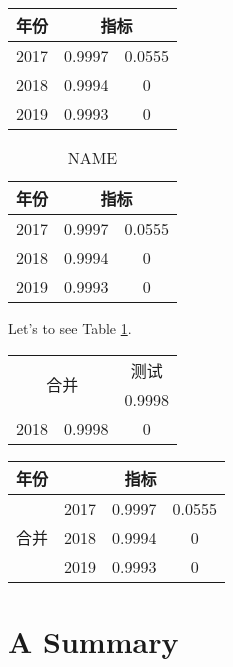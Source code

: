 \documentclass{mcmthesis}
\begin{document}
\begin{center}
\begin{tabular}{c|cc}
\hline
年份 & \multicolumn{2}{c}{指标} \\
\hline
2017 & 0.9997 & 0.0555 \\
2018 & 0.9994 & 0      \\
2019 & 0.9993 & 0      \\
\hline
\end{tabular}
\end{center}

\lipsum[3]
\begin{table}[h]
\centering
\begin{tabular}{c|cc}
\hline
年份 & \multicolumn{2}{c}{指标} \\
\hline
2017 & 0.9997 & 0.0555 \\
2018 & 0.9994 & 0      \\
2019 & 0.9993 & 0      \\
\hline

\end{tabular}
\caption{NAME}\label{SIGN}
\end{table}

Let's to see Table \ref{SIGN}.

\begin{minipage}{0.5\linewidth}
\begin{tabular}{|c|c|c|}
\hline
\multicolumn{2}{|c|}{\multirow{2}{*}{合并}} & 测试 \\
\cline{3-3}
\multicolumn{2}{|c|}{} & 0.9998 \\
\hline
2018 & 0.9998 & 0 \\
\hline
\end{tabular}
\end{minipage}
\begin{minipage}{0.5\linewidth}
\begin{tabular}{c|ccc}
\hline
年份 & \multicolumn{3}{c}{指标} \\
\hline
\multirow{3}{*}{合并} & 2017 & 0.9997 & 0.0555 \\
&2018 & 0.9994 & 0      \\
&2019 & 0.9993 & 0      \\
\hline
\end{tabular}
\end{minipage}








\section{A Summary}
\lipsum[7]
\end{document}
